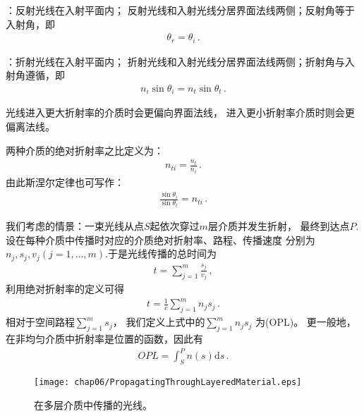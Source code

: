 \begin{proposition}\label{theorem:0607-LawOfReflection}
    ：反射光线在入射平面内；
    反射光线和入射光线分居界面法线两侧；反射角等于入射角，即
    \begin{align}
        \theta_r=\theta_i \, .
    \end{align}
\end{proposition}
\begin{proposition}\label{theorem:0607-LawOfRefraction}
    ：折射光线在入射平面内；
    折射光线和入射光线分居界面法线两侧；折射角与入射角遵循，即
    \begin{align}
        n_i\sin\theta_i=n_t\sin\theta_t \, .
    \end{align}
\end{proposition}
\begin{corollary}
    光线进入更大折射率的介质时会更偏向界面法线，
    进入更小折射率介质时则会更偏离法线。
\end{corollary}
\begin{definition}
    两种介质的绝对折射率之比定义为：
    \begin{align}
        n_{ti}=\frac{n_t}{n_i}\, .
    \end{align}
    由此斯涅尔定律也可写作：
    \begin{align}
        \frac{\sin\theta_i}{\sin\theta_t}=n_{ti}\, .
    \end{align}
\end{definition}

我们考虑的情景：一束光线从点$S$起依次穿过$m$层介质并发生折射，
最终到达点$P$.设在每种介质中传播时对应的介质绝对折射率、路程、传播速度
分别为$n_j, s_j, v_j (j=1,\ldots,m)$.于是光线传播的总时间为
\begin{align}
    t=\sum\limits_{j=1}^{m}{\frac{s_j}{v_j}}\, ,
\end{align}
利用绝对折射率的定义可得
\begin{align}
    t=\frac{1}{c}\sum\limits_{j=1}^{m}{n_js_j}\, .
\end{align}
相对于空间路程$\sum\limits_{j=1}^{m}{s_j}$，
我们定义上式中的$\sum\limits_{j=1}^{m}{n_js_j}$
为(OPL)。
更一般地，在非均匀介质中折射率是位置的函数，因此有
\begin{align}
    OPL=\int_S^P {n(s)\mathrm{d}s}\, .
\end{align}
\begin{figure}[htbp]
    \centering\texttt{[image: chap06/PropagatingThroughLayeredMaterial.eps]}
    \caption{在多层介质中传播的光线。}
    \label{fig:6.27}
\end{figure}

